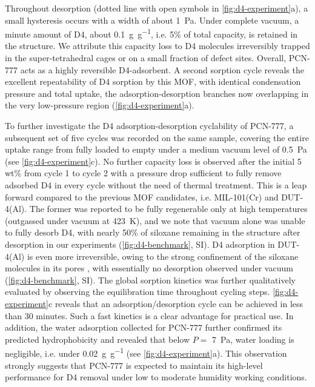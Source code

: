 Throughout desorption (dotted line with open symbols in
\cref{fig:d4-experiment}a), a small hysteresis occurs with a width of about
\SI{1}{\pascal}. Under complete vacuum, a minute amount of D4, about
\SI{0.1}{\gram\per\gram}, i.e. 5\% of total capacity, is retained in the
structure. We attribute this capacity loss to D4 molecules irreversibly trapped
in the super-tetrahedral cages or on a small fraction of defect sites. Overall,
PCN-777 acts as a highly reversible D4-adsorbent. A second sorption cycle
reveals the excellent repeatability of D4 sorption by this MOF, with identical
condensation pressure and total uptake, the adsorption-desorption branches now
overlapping in the very low-pressure region (\cref{fig:d4-experiment}a).

To further investigate the D4 adsorption-desorption cyclability of PCN-777, a
subsequent set of five cycles was recorded on the same sample, covering the
entire uptake range from fully loaded to empty under a medium vacuum level of
\SI{0.5}{\pascal} (see \cref{fig:d4-experiment}c). No further capacity loss is
observed after the initial 5 wt\% from cycle 1 to cycle 2 with a pressure drop
sufficient to fully remove adsorbed D4 in every cycle without the need of
thermal treatment. This is a leap forward compared to the previous MOF
candidates, i.e. MIL-101(Cr) and DUT-4(Al). The former was reported
\citep{gargiuloChromiumbasedMIL101Metal2019} to be fully regenerable only at
high temperatures (outgassed under vacuum at \SI{423}{\kelvin}), and we note
that vacuum alone was unable to fully desorb D4, with nearly 50\% of siloxane
remaining in the structure after desorption in our experiments
(\cref{fig:d4-benchmark}, SI). D4 adsorption in DUT-4(Al) is even more irreversible,
owing to the strong confinement of the siloxane molecules in its pores
\citep{mito-okaSiloxaneD4Capture2013}, with essentially no desorption observed
under vacuum (\cref{fig:d4-benchmark}, SI). The global sorption kinetics was
further qualitatively evaluated by observing the equilibration time throughout
cycling steps. \cref{fig:d4-experiment}c reveals that an adsorption/desorption
cycle can be achieved in less than 30 minutes. Such a fast kinetics is a clear
advantage for practical use. In addition, the water adsorption collected for
PCN-777 further confirmed its predicted hydrophobicity and revealed that below
\(P=\) \SI{7}{\pascal}, water loading is negligible, i.e. under
\SI{0.02}{\gram\per\gram} (see \cref{fig:d4-experiment}a). This observation
strongly suggests that PCN-777 is expected to maintain its high-level
performance for D4 removal under low to moderate humidity working conditions.

